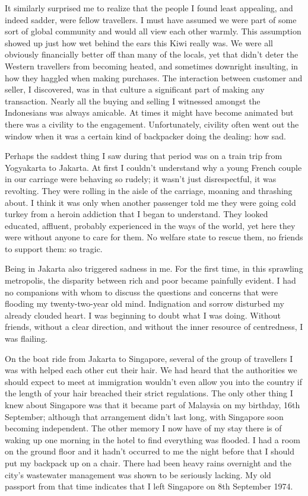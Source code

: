 It similarly surprised me to realize that the people I found least
appealing, and indeed sadder, were fellow travellers. I must have
assumed we were part of some sort of global community and would all view
each other warmly. This assumption showed up just how wet behind the
ears this Kiwi really was. We were all obviously financially better off
than many of the locals, yet that didn't deter the Western travellers
from becoming heated, and sometimes downright insulting, in how they
haggled when making purchases. The interaction between customer and
seller, I discovered, was in that culture a significant part of making
any transaction. Nearly all the buying and selling I witnessed amongst
the Indonesians was always amicable. At times it might have become
animated but there was a civility to the engagement. Unfortunately,
civility often went out the window when it was a certain kind of
backpacker doing the dealing: how sad.

Perhaps the saddest thing I saw during that period was on a train trip
from Yogyakarta to Jakarta. At first I couldn't understand why a young
French couple in our carriage were behaving so rudely; it wasn't just
disrespectful, it was revolting. They were rolling in the aisle of the
carriage, moaning and thrashing about. I think it was only when another
passenger told me they were going cold turkey\cite{turkey}
from a heroin addiction that I began to understand.
They looked educated, affluent, probably experienced in the ways of the
world, yet here they were without anyone to care for them. No welfare
state to rescue them, no friends to support them: so tragic.

Being in Jakarta also triggered sadness in me. For the first time, in
this sprawling metropolis, the disparity between rich and poor became
painfully evident. I had no companions with whom to discuss the
questions and concerns that were flooding my twenty-two-year old mind.
Indignation and sorrow disturbed my already clouded heart. I was
beginning to doubt what I was doing. Without friends, without a clear
direction, and without the inner resource of centredness, I was
flailing.

On the boat ride from Jakarta to Singapore, several of the group of
travellers I was with helped each other cut their hair. We had heard
that the authorities we should expect to meet at immigration wouldn't
even allow you into the country if the length of your hair breached
their strict regulations. The only other thing I knew about Singapore
was that it became part of Malaysia\cite{malaysia}
on my birthday, 16th September; although that arrangement
didn't last long, with Singapore soon becoming independent. The other
memory I now have of my stay there is of waking up one morning in the
hotel to find everything was flooded. I had a room on the ground floor
and it hadn't occurred to me the night before that I should put my
backpack up on a chair. There had been heavy rains overnight and the
city's wastewater management was shown to be seriously lacking. My old
passport from that time indicates that I left Singapore on 8th September
1974.

